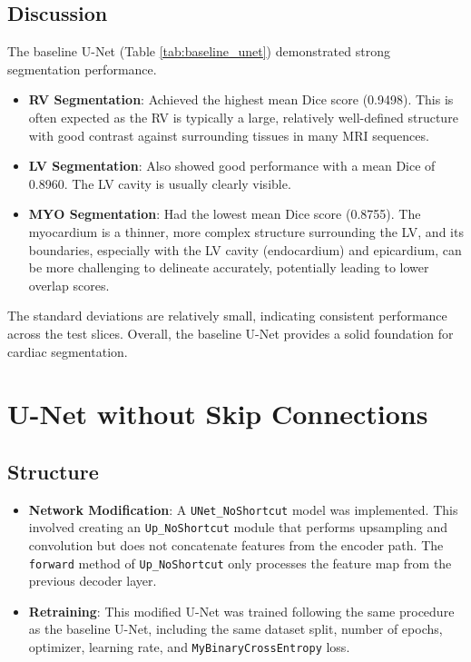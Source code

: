 \documentclass{article}
\begin{document}
\subsection{Discussion}
The baseline U-Net (Table \ref{tab:baseline_unet}) demonstrated strong segmentation performance.
\begin{itemize}
  \item \textbf{RV Segmentation}: Achieved the highest mean Dice score (0.9498). This is often expected as the RV is
        typically a large, relatively well-defined structure with good contrast against surrounding tissues in many MRI sequences.
  \item \textbf{LV Segmentation}: Also showed good performance with a mean Dice of 0.8960. The LV cavity is usually clearly visible.
  \item \textbf{MYO Segmentation}: Had the lowest mean Dice score (0.8755). The myocardium is a thinner, more complex structure
        surrounding the LV, and its boundaries, especially with the LV cavity (endocardium) and epicardium, can be more challenging to
        delineate accurately, potentially leading to lower overlap scores.
\end{itemize}
The standard deviations are relatively small, indicating consistent performance across the test slices. Overall, the baseline U-Net
provides a solid foundation for cardiac segmentation.



\section{U-Net without Skip Connections}

\subsection{Structure}
\begin{itemize}
  \item \textbf{Network Modification}: A \texttt{UNet\_NoShortcut} model was implemented. This involved creating an
        \texttt{Up\_NoShortcut} module that performs upsampling and convolution but does not concatenate features from the encoder
        path. The \texttt{forward} method of \texttt{Up\_NoShortcut} only processes the feature map from the previous decoder layer.
  \item \textbf{Retraining}: This modified U-Net was trained following the same procedure as the baseline U-Net,
        including the same dataset split, number of epochs, optimizer, learning rate, and \texttt{MyBinaryCrossEntropy} loss.
\end{itemize}
\end{document}
